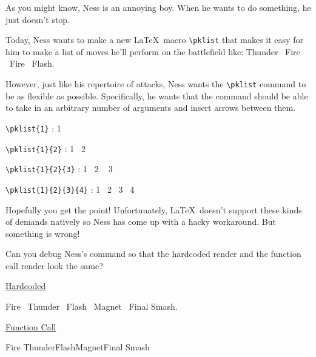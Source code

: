 

As you might know, Ness is an annoying boy. When he wants to do something, he just doesn't stop.

Today, Ness wants to make a new \LaTeX~macro \verb|\pklist| that makes it easy for him to make a list of moves he'll perform on the battlefield like: Thunder \textrightarrow~Fire \textrightarrow~Fire \textrightarrow~Flash.

However, just like his repertoire of attacks, Ness wants the \verb|\pklist| command to be as flexible as possible. Specifically, he wants that the command should be able to take in an arbitrary number of arguments and insert arrows between them.

\verb|\pklist{1}| : 1

\verb|\pklist{1}{2}| : 1 \textrightarrow~2

\verb|\pklist{1}{2}{3}| : 1 \textrightarrow~2 \textrightarrow~ 3

\verb|\pklist{1}{2}{3}{4}| : 1 \textrightarrow~2 \textrightarrow~3 \textrightarrow~4

Hopefully you get the point! Unfortunately, \LaTeX~doesn't support these kinds of demands natively so Ness has come up with a hacky workaround. But something is wrong!

\newcommand{\pklist}[1]{
    #1 \@ifnextchar\bgroup{\recursepklist}{\par}
}
\newcommand{\recursepklist}[1]{\textrightarrow~#1 \@ifnextchar\bgroup{\recursepklist}{\par}}

Can you debug Ness's command so that the hardcoded render and the function call render look the same?

\underline{Hardcoded}

Fire \textrightarrow~Thunder \textrightarrow~Flash \textrightarrow~Magnet \textrightarrow~Final Smash.

\underline{Function Call}

\pklist{Fire}{Thunder}{Flash}{Magnet}{Final Smash}

